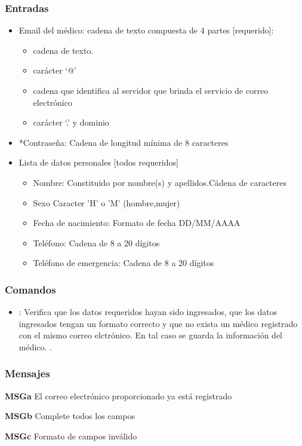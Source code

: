 \subsubsection{Entradas}
\begin{itemize}
	\item Email del médico: cadena de texto compuesta de 4 partes [requerido]:  
	\begin{itemize}
		\item cadena de texto.
		\item carácter ‘@’
		\item cadena que identifica al servidor que brinda el servicio de correo electrónico
		\item carácter ‘.’ y dominio
	\end{itemize}
	\item *Contraseña:  Cadena de longitud mínima de 8 caracteres
	\item Lista de datos personales [todos requeridos]
	\begin{itemize}
		\item Nombre: Constituido por nombre(s) y apellidos.Cádena de caracteres
		\item Sexo  Caracter 'H' o 'M' (hombre,mujer)
		\item Fecha de nacimiento: Formato de fecha DD/MM/AAAA
		\item Teléfono: Cadena de 8 a 20 dígitos
		\item Teléfono de emergencia: Cadena de 8 a 20 dígitos
		
	\end{itemize}
\end{itemize}

\subsubsection{Comandos}
\begin{itemize}
	\item {}:  Verifica que los datos requeridos hayan sido ingresados, que los datos ingresados tengan un formato correcto y que no exista un médico registrado con el mismo correo elctrónico. En tal caso se guarda la información del médico.  .	
\end{itemize}

\subsubsection{Mensajes}
\begin{Citemize}
	\item {\bf MSGa} El correo electrónico proporcionado ya está registrado
	\item {\bf MSGb} Complete todos los campos
	\item {\bf MSGc} Formato de campos inválido
\end{Citemize}


